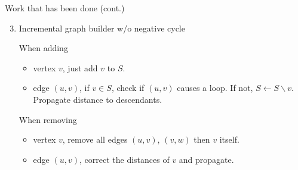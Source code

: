 \documentclass{beamer}
\begin{document}
\begin{frame}[fragile]{Work that has been done (cont.)}

\vspace*{16pt}\begin{enumerate}
\setcounter{enumi}{2}
\item Incremental graph builder w/o negative cycle\newline


{
When adding
\begin{itemize}
\item\alert{vertex $v$}, just add $v$ to $S$.
\item\alert{edge $(u,v)$}, if $v\in S$, check if $(u,v)$ causes a loop.\newline
If not, $S\leftarrow S\backslash v$. Propagate distance to descendants.
\end{itemize}

\begin{center}
\end{center}
}

{
When removing
\begin{itemize}
\item\alert{vertex $v$}, remove all edges $(u,v)$, $(v,w)$ then $v$ itself.
\item\alert{edge $(u,v)$}, correct the distances of $v$ and propagate.
\end{itemize}

\begin{center}
\end{center}
}
\end{enumerate} \vspace*{100pt}

\end{frame}
\end{document}
